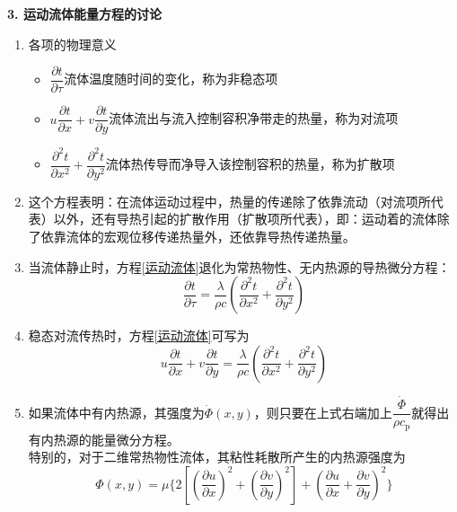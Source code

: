 \noindent \textbf{3. 运动流体能量方程的讨论}
\begin{enumerate}[\hspace*{2em}(1) ]
	\item 各项的物理意义
	\begin{itemize}
		\item $\dfrac{\partial t}{\partial \tau}$\quad 流体温度随时间的变化，称为非稳态项
		\vspace*{0.5em}
		\item $u\dfrac{\partial t}{\partial x}+v\dfrac{\partial t}{\partial y}$\quad 流体流出与流入控制容积净带走的热量，称为对流项
		\vspace*{0.5em}
		\item $\dfrac{\partial^2 t}{\partial x^2} + \dfrac{\partial^2 t}{\partial y^2}$\quad 流体热传导而净导入该控制容积的热量，称为扩散项
	\end{itemize}
	\item 这个方程表明：在流体运动过程中，热量的传递除了依靠流动（对流项所代表）以外，还有导热引起的扩散作用（扩散项所代表），即：运动着的流体除了依靠流体的宏观位移传递热量外，还依靠导热传递热量。
	
	\item 当流体静止时，方程\eqref{运动流体}退化为常热物性、无内热源的导热微分方程：
	\begin{equation}
		\dfrac{\partial t}{\partial \tau} = \dfrac{\lambda}{\rho c}\left(\dfrac{\partial^2 t}{\partial x^2} + \dfrac{\partial^2 t}{\partial y^2}\right)
	\end{equation}
	
	\item 稳态对流传热时，方程\eqref{运动流体}可写为
	\begin{equation}
		u \dfrac{\partial t}{\partial x} + v \dfrac{\partial t}{\partial y} = \dfrac{\lambda}{\rho c}\left(\dfrac{\partial^2 t}{\partial x^2} + \dfrac{\partial^2 t}{\partial y^2}\right)
	\end{equation}
	
	\item 如果流体中有内热源，其强度为$\dot{\varPhi}(x,y)$，则只要在上式右端加上$\dfrac{\dot{\varPhi}}{\rho c_\text{p}}$就得出有内热源的能量微分方程。\\
	
	特别的，对于二维常热物性流体，其粘性耗散所产生的内热源强度为
	\begin{equation}
		\varPhi(x,y) = \mu \Bigg\lbrace 2 \left[\left(\dfrac{\partial u}{\partial x}\right)^2 + \left(\dfrac{\partial v}{\partial y}\right)^2\right] + \left(\dfrac{\partial u}{\partial x} + \dfrac{\partial v}{\partial y}\right)^2 \Bigg\rbrace
	\end{equation}
	
\end{enumerate}

